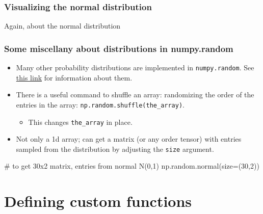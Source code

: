 \documentclass{beamer}
\newenvironment{codeblock}
    {\hfill\begin{beamerboxesrounded}[lower=codecol, width=0.8\textwidth]
    \medskip

    }
    { 
    \end{beamerboxesrounded}\hfill
    }
\theoremstyle{example}
\newcommand{\ct}[1]{\lstinline[language=Python]!#1!}
\newcommand{\ttt}[1]{{\small\texttt{#1}}}
\begin{document}

\begin{frame}[fragile]
\frametitle{Visualizing the normal distribution}
    
Again, about the normal distribution
    
    
\end{frame}

\begin{frame}[fragile]
\frametitle{Some miscellany about distributions in {\ttm numpy.random}}
\begin{itemize}
    \item Many other probability distributions are implemented in \ttt{numpy.random}. See \href{https://numpy.org/doc/2.1/reference/random/legacy.html#distributions}{this link} for information about them.
    
    \item There is a useful command to shuffle an array: randomizing the order of the entries in the array: \ttt{np.random.shuffle(the}\ct{_}\ttt{array)}.
    \begin{itemize}
        \item This changes \ttt{the}\ct{_}\ttt{array} in place.
    \end{itemize}

    \item Not only a 1d array; can get a matrix (or any order tensor) with entries sampled from the distribution by adjusting the \ttt{size} argument.
\end{itemize}

\begin{codeblock}

\begin{python}
# to get 30x2 matrix, entries from normal N(0,1)
np.random.normal(size=(30,2))
\end{python}

\end{codeblock}

\end{frame}

\section{Defining custom functions}
\end{document}
